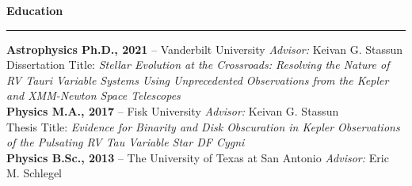 \documentclass[12pt]{article}
\begin{document}
\newpage
\noindent
{\bf Education} \\
\vspace{-10mm}
\begin{center}
\rule{\textwidth}{0.2mm}
\end{center}
\vspace{-3mm}
\noindent\textbf{Astrophysics Ph.D., 2021} -- Vanderbilt University \hfill \textit{Advisor:} Keivan G. Stassun \\
\hspace*{1cm}Dissertation Title: {\it Stellar Evolution at the Crossroads: Resolving the Nature of RV Tauri Variable Systems Using Unprecedented Observations from the Kepler and XMM-Newton Space Telescopes} \\
\textbf{Physics M.A., 2017} -- Fisk University \hfill \textit{Advisor:} Keivan G. Stassun \\
\hspace*{1cm}Thesis Title: {\it Evidence for Binarity and Disk Obscuration in Kepler Observations of the Pulsating RV Tau Variable Star DF Cygni} \\
\textbf{Physics B.Sc., 2013} -- The University of Texas at San Antonio \hfill \textit{Advisor:} Eric M. Schlegel \\
\end{document}
